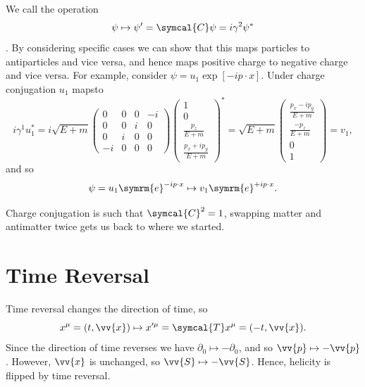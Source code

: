 \documentclass[fleqn]{NotesClass}
\newcommand{\e}{\symrm{e}}
\newcommand{\chargeConjugation}{\symcal{C}}
\newcommand{\timeReversal}{\symcal{T}}
\begin{document}
    We call the operation
    \begin{equation}
        \psi \mapsto \psi' = \chargeConjugation \psi = i\gamma^2\psi^*
    \end{equation}
    .
    By considering specific cases we can show that this maps particles to antiparticles and vice versa, and hence maps positive charge to negative charge and vice versa.
    For example, consider \(\psi = u_1 \exp[-ip \cdot x]\).
    Under charge conjugation \(u_1\) mapsto
    \begin{equation}
        i\gamma^1u_1^* = i\sqrt{E + m}
        \begin{pmatrix}
            0 & 0 & 0 & -i \\
            0 & 0 & i & 0 \\
            0 & i & 0 & 0 \\
            -i & 0 & 0 & 0
        \end{pmatrix}
        \begin{pmatrix}
            1\\ 0\\ \frac{p_z}{E + m}\\ \frac{p_x + ip_y}{E + m}
        \end{pmatrix}
        ^* = \sqrt{E + m}
        \begin{pmatrix}
            \frac{p_x - ip_y}{E + m}\\ \frac{-p_z}{E + m}\\ 0\\ 1
        \end{pmatrix}
        = v_1,
    \end{equation}
    and so
    \begin{equation}
        \psi = u_1 \e^{-ip \cdot x} \mapsto v_1 \e^{+ip \cdot x}.
    \end{equation}
    
    Charge conjugation is such that \(\chargeConjugation^2 = 1\), swapping matter and antimatter twice gets us back to where we started.
    
    \section{Time Reversal}
    Time reversal changes the direction of time, so
    \begin{equation}
        x^\mu = (t, \vv{x}) \mapsto x'^\mu = \timeReversal x^\mu = (-t, \vv{x}).
    \end{equation}
    Since the direction of time reverses we have \(\partial_0 \mapsto -\partial_0\), and so \(\vv{p} \mapsto -\vv{p}\).
    However, \(\vv{x}\) is unchanged, so \(\vv{S} \mapsto -\vv{S}\).
    Hence, helicity is flipped by time reversal.
    
\end{document}
